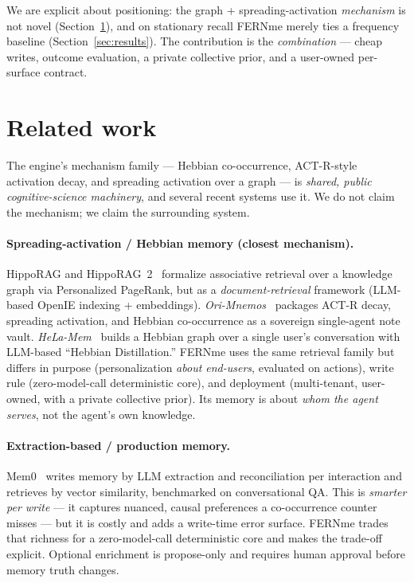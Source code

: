 \documentclass[11pt]{article}
\begin{document}
We are explicit about positioning: the graph + spreading-activation \emph{mechanism} is
not novel (Section~\ref{sec:related}), and on stationary recall FERNme merely ties a
frequency baseline (Section~\ref{sec:results}). The contribution is the
\emph{combination} --- cheap writes, outcome evaluation, a private collective prior, and
a user-owned per-surface contract.

\section{Related work}\label{sec:related}
The engine's mechanism family --- Hebbian co-occurrence, ACT-R-style activation decay,
and spreading activation over a graph --- is \emph{shared, public cognitive-science
machinery}, and several recent systems use it. We do not claim the mechanism; we claim
the surrounding system.

\paragraph{Spreading-activation / Hebbian memory (closest mechanism).} HippoRAG and
HippoRAG~2~\cite{hipporag,hipporag2} formalize associative retrieval over a knowledge
graph via Personalized PageRank, but as a \emph{document-retrieval} framework (LLM-based
OpenIE indexing + embeddings). \emph{Ori-Mnemos}~\cite{ori} packages ACT-R decay,
spreading activation, and Hebbian co-occurrence as a sovereign single-agent note vault.
\emph{HeLa-Mem}~\cite{helamem} builds a Hebbian graph over a single user's conversation
with LLM-based ``Hebbian Distillation.'' FERNme uses the same retrieval family but
differs in purpose (personalization \emph{about end-users}, evaluated on actions), write
rule (zero-model-call deterministic core), and deployment (multi-tenant, user-owned, with a private
collective prior). Its memory is about \emph{whom the agent serves}, not the agent's own
knowledge.

\paragraph{Extraction-based / production memory.} Mem0~\cite{mem0} writes memory by LLM
extraction and reconciliation per interaction and retrieves by vector similarity,
benchmarked on conversational QA. This is \emph{smarter per write} --- it captures
nuanced, causal preferences a co-occurrence counter misses --- but it is costly and adds
a write-time error surface. FERNme trades that richness for a zero-model-call
deterministic core and makes the trade-off explicit. Optional enrichment is
propose-only and requires human approval before memory truth changes.
\end{document}
